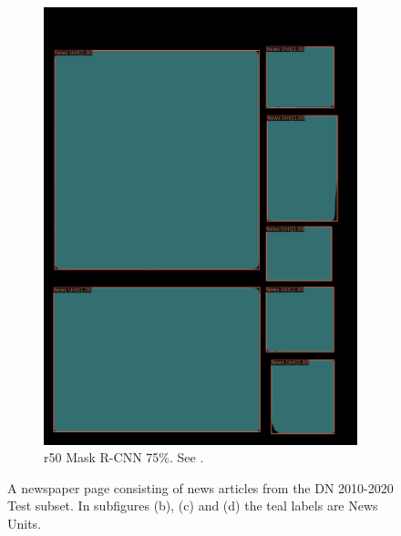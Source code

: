 \documentclass[oneside, english, bibtex]{kththesis}
\begin{document}
\begin{figure}[!htb]
\begin{adjustbox}{center,max size={\textwidth}{0.9\textheight}}
{\begin{subfigure}{0.6\textwidth}
\includegraphics[width=\linewidth]{figures/labels-vanilla-0.75/AVThDFz.jpg}
  \caption{r50 Mask R-CNN 75\%. See . }
  \label{fig:AVThDFz_pred}
\end{subfigure}}
\end{adjustbox}
  \caption{A newspaper page consisting of news articles from the DN 2010-2020 Test subset. In subfigures (b), (c) and (d) the teal labels are News Units.}
\label{fig:AVThDFz}
\end{figure}

\clearpage
\end{document}
